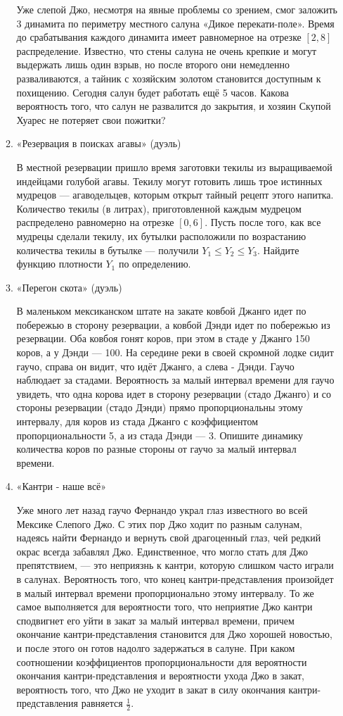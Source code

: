 \documentclass[11pt, a4paper]{article}
\renewcommand{\leq}{\leqslant}
\theoremstyle{definition}
\begin{document}
\begin{enumerate}
\begin{enumerate}
    Уже слепой Джо, несмотря на явные проблемы со зрением, смог заложить 3 динамита по периметру местного салуна «Дикое перекати-поле». Время до срабатывания каждого динамита имеет равномерное на отрезке $[2, 8]$ распределение. Известно, что стены салуна не очень крепкие и могут выдержать лишь один взрыв, но после второго они немедленно разваливаются, а тайник с хозяйским золотом  становится доступным к похищению. Сегодня салун будет работать ещё 
    5 часов. Какова вероятность того, что салун не развалится до закрытия, и хозяин Скупой Хуарес не потеряет свои пожитки?
    
    \item «Резервация в поисках агавы» (дуэль)
    
    В местной резервации пришло время заготовки текилы из выращиваемой индейцами голубой агавы. Текилу могут готовить лишь трое истинных мудрецов — агаводельцев, которым открыт тайный рецепт этого напитка. Количество текилы (в литрах), приготовленной каждым мудрецом распределено равномерно на отрезке $[0, 6]$. Пусть после того, как все мудрецы сделали текилу, их бутылки расположили по возрастанию количества текилы в бутылке — получили $Y_1 \leq Y_2 \leq Y_3$. Найдите функцию плотности $Y_1$ по определению. 
    \item «Перегон скота» (дуэль)
    
     В маленьком мексиканском штате на закате ковбой Джанго идет по побережью в сторону резервации, а ковбой Дэнди идет по побережью из резервации. Оба ковбоя гонят коров, при этом в стаде у Джанго 150 коров, а у Дэнди — 100. На середине реки в своей скромной лодке сидит гаучо, справа он видит, что идёт Джанго, а слева - Дэнди. Гаучо наблюдает за стадами. Вероятность за малый интервал времени для гаучо увидеть, что одна корова идет в сторону  резервации (стадо Джанго) и со стороны резервации (стадо Дэнди)  прямо пропорциональны этому интервалу, для коров из стада Джанго с коэффициентом пропорциональности 5, а из стада Дэнди — 3. Опишите динамику количества коров по разные стороны от гаучо за малый интервал времени.    
    \item «Кантри - наше всё» %
    
    Уже много лет назад гаучо Фернандо украл глаз известного во всей Мексике Слепого Джо. С этих пор Джо ходит по разным салунам, надеясь найти Фернандо и вернуть свой драгоценный глаз, чей редкий окрас всегда забавлял Джо. Единственное, что могло стать для Джо препятствием, — это неприязнь к кантри, которую слишком часто играли в салунах. Вероятность того, что конец кантри-представления произойдет в малый интервал времени пропорционально этому  интервалу. То же самое выполняется для вероятности того, что неприятие Джо кантри сподвигнет его уйти в закат за малый интервал времени, причем окончание кантри-представления становится для Джо хорошей новостью, и после этого он готов надолго задержаться в салуне. При каком соотношении коэффициентов пропорциональности для вероятности окончания кантри-представления и вероятности ухода Джо в закат, вероятность того, что Джо не уходит в закат в силу окончания кантри-представления равняется $\frac{1}{2}$.
    

\end{enumerate}
\end{enumerate}
\end{document}
